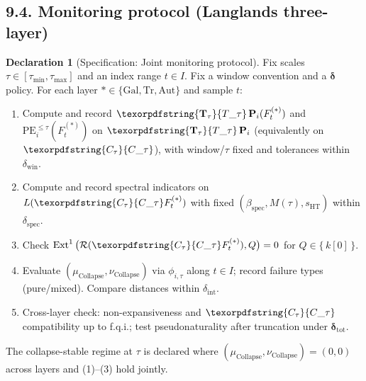 \documentclass[11pt]{article}
\numberwithin{equation}{section}
\theoremstyle{plain}
\theoremstyle{definition}
\theoremstyle{remark}
\DeclareMathOperator{\Ext}{Ext}
\DeclareRobustCommand{\hyp}{\nobreakdash-}
\newcommand{\Rfun}{\mathcal{R}}
\theoremstyle{plain}
\theoremstyle{definition}
\numberwithin{equation}{section}
\theoremstyle{definition}
\newtheorem{declaration}[theorem]{Declaration}
\DeclareRobustCommand{\Ttau}{\texorpdfstring{\ensuremath{\mathbf{T}_{\tau}}}{T\_\tau}}
\DeclareRobustCommand{\Ctau}{\texorpdfstring{\ensuremath{C_{\tau}}}{C\_\tau}}
\DeclareRobustCommand{\muc}{\mu_{\mathrm{Collapse}}}
\DeclareRobustCommand{\nuc}{\nu_{\mathrm{Collapse}}}
\DeclareRobustCommand{\Qtest}{\{\,k[0]\,\}}
\numberwithin{equation}{section}
\theoremstyle{plain}
\theoremstyle{definition}
\theoremstyle{remark}
\providecommand{\Cfun}[1]{\mathsf{C}_{#1}}
\providecommand{\Tfun}[1]{\mathbf{T}_{#1}}
\providecommand{\Ctau}{\Cfun{\tau}}
\providecommand{\Ttau}{\Tfun{\tau}}
\providecommand{\muc}{\mu_{\mathrm{Collapse}}}
\providecommand{\nuc}{\nu_{\mathrm{Collapse}}}
\begin{document}
\subsection*{9.4. Monitoring protocol (Langlands three\hyp layer)}
\begin{declaration}[Specification: Joint monitoring protocol]\label{spec:9-protocol}
Fix scales \(\tau\in[\tau_{\min},\tau_{\max}]\) and an index range \(t\in I\).
Fix a window convention and a \(\boldsymbol{\delta}\)\nobreakdash policy.
For each layer \(\ast\in\{\mathrm{Gal},\mathrm{Tr},\mathrm{Aut}\}\) and sample \(t\):
\begin{enumerate}
  \item Compute and record \(\Ttau\,\mathbf{P}_i(F^{(\ast)}_t)\) and \(\mathrm{PE}_i^{\le \tau}(F^{(\ast)}_t)\) on \(\Ttau\,\mathbf{P}_i\) (equivalently on \(\Ctau\)), with window/\(\tau\) fixed and tolerances within \(\delta_{\mathrm{win}}\).
  \item Compute and record spectral indicators on \(L(\Ctau F^{(\ast)}_t)\) with fixed \((\beta_{\mathrm{spec}},M(\tau),s_{\mathrm{HT}})\) within \(\delta_{\mathrm{spec}}\).
  \item Check \(\Ext^1\big(\Rfun(\Ctau F^{(\ast)}_t),Q\big)=0\) for \(Q\in\Qtest\).
  \item Evaluate \((\muc,\nuc)\) via \(\phi_{i,\tau}\) along \(t\in I\); record failure types (pure/mixed). Compare distances within \(\delta_{\mathrm{int}}\).
  \item Cross\hyp layer check: non\hyp expansiveness and \(\Ctau\)\nobreakdash compatibility up to f.q.i.; test pseudonaturality after truncation under \(\boldsymbol{\delta}_{\mathrm{tot}}\).
\end{enumerate}
The collapse\hyp stable regime at \(\tau\) is declared where \((\muc,\nuc)=(0,0)\) across layers and (1)–(3) hold jointly.
\end{declaration}
\end{document}
